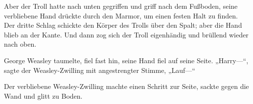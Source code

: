 
Aber der Troll hatte nach unten gegriffen und griff nach dem Fußboden, seine verbliebene Hand drückte durch den Marmor, um einen festen Halt zu finden. Der dritte Schlag schickte den Körper des Trolls über den Spalt; aber die Hand blieb an der Kante. Und dann zog sich der Troll eigenhändig und brüllend wieder nach oben.

George Weasley taumelte, fiel fast hin, seine Hand fiel auf seine Seite. „Harry—“, sagte der Weasley-Zwilling mit angestrengter Stimme, „Lauf—“

Der verbliebene Weasley-Zwilling machte einen Schritt zur Seite, sackte gegen die Wand und glitt zu Boden.

